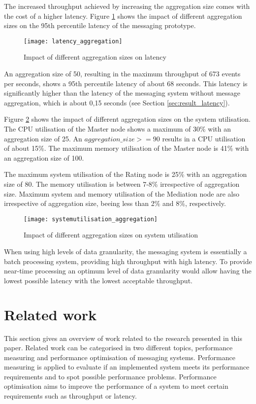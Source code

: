 The increased throughput achieved by increasing the aggregation size comes with the cost of a higher latency. Figure \ref{fig:ch4_latency_aggregation} shows the impact of different aggregation sizes on the 95th percentile latency of the messaging prototype. 
\begin{figure}[htbp]
	\centering
	\texttt{[image: latency\_aggregation]}
	\caption{Impact of different aggregation sizes on latency}
	\label{fig:ch4_latency_aggregation}
\end{figure}

An aggregation size of 50, resulting in the maximum throughput of 673 events per seconds, shows a 95th percentile latency of about 68 seconds. This latency is significantly higher than the latency of the messaging system without message aggregation, which is about 0,15 seconds (see Section \ref{sec:result_latency}).

Figure \ref{fig:ch4_systemutilisation_aggregation} shows the impact of different aggregation sizes on the system utilisation. The CPU utilisation of the Master node shows a maximum of 30\% with an aggregation size of 25. An $aggregation\_size >= 90$ results in a CPU utilisation of about 15\%. The maximum memory utilisation of the Master node is 41\% with an aggregation size of 100.

The maximum system utilisation of the Rating node is 25\% with an aggregation size of 80. The memory utilisation is between 7-8\% irrespective of aggregation size. Maximum system and memory utilisation of the Mediation node are also irrespective of aggregation size, beeing less than 2\% and 8\%, respectively.

\begin{figure}[htbp]
	\centering
	\texttt{[image: systemutilisation\_aggregation]}
	\caption{Impact of different aggregation sizes on system utilisation}
	\label{fig:ch4_systemutilisation_aggregation}
\end{figure}

When using high levels of data granularity, the messaging system is essentially a batch processing system, providing high throughput with high latency. To provide near-time processing an optimum level of data granularity would allow having the lowest possible latency with the lowest acceptable throughput.

\section{Related work}\label{sec:ch4_related_work}
This section gives an overview of work related to the research presented in this paper. Related work can be categorised in two different topics, performance measuring and performance optimisation of messaging systems. Performance measuring is applied to evaluate if an implemented system meets its performance requirements and to spot possible performance problems. Performance optimisation aims to improve the performance of a system to meet certain requirements such as throughput or latency.

